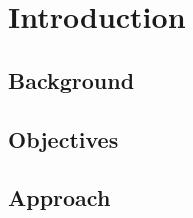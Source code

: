 \chapter{Introduction}
\label{chap:intro}
\section{Background}
\label{sec:background}
\section{Objectives}
\label{sec:objectives}
\section{Approach}
\label{sec:approach}
